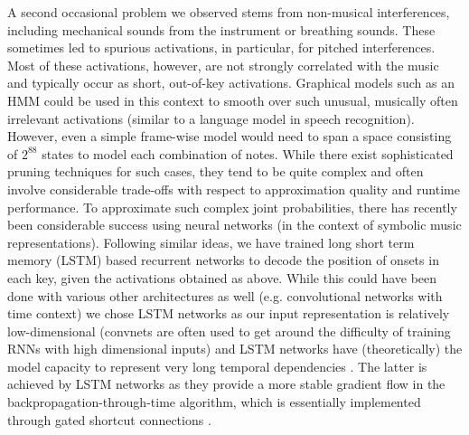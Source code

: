 \documentclass{article}
\begin{document}
A second occasional problem we observed stems from non-musical interferences, including mechanical sounds from the instrument or breathing sounds.
These sometimes led to spurious activations, in particular, for pitched interferences. 
Most of these activations, however, are not strongly correlated with the music and typically occur as short, out-of-key activations.
Graphical models such as an HMM could be used in this context to smooth over such unusual, musically often irrelevant activations (similar to a language model in speech recognition).
However, even a simple frame-wise model would need to span a space consisting of $2^{88}$ states to model each combination of notes.
While there exist sophisticated pruning techniques for such cases, they tend to be quite complex and often involve considerable trade-offs with respect to approximation quality and runtime performance.
To approximate such complex joint probabilities, there has recently been considerable success using neural networks \cite{BoulangerBV12_DeepRNN_ICML}\cite{EckS2002_BluesWithLSTMNets_WNNSP}\cite{SigtiaBD2016_NNPianoTrans_TASLP} (in the context of symbolic music representations).
Following similar ideas, we have trained long short term memory (LSTM) based recurrent networks to decode the position of onsets in each key, given the activations obtained as above.
While this could have been done with various other architectures as well (e.g. convolutional networks with time context) we chose LSTM networks as our input representation is relatively low-dimensional (convnets are often used to get around the difficulty of training RNNs with high dimensional inputs) and LSTM networks have (theoretically) the model capacity to represent very long temporal dependencies \cite{BoulangerBV12_DeepRNN_ICML}. The latter is achieved by LSTM networks as they provide a more stable gradient flow in the backpropagation-through-time algorithm, which is essentially implemented through gated shortcut connections \cite{EckS2002_BluesWithLSTMNets_WNNSP}. 
\end{document}
